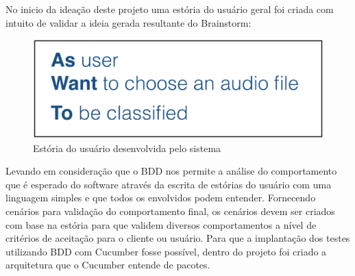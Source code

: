 No inicio da ideação deste projeto uma estória do usuário geral foi criada com intuito de validar a ideia gerada resultante do Brainstorm: 


\begin{figure}[H]
	\centering
	\captionsetup{justification=centering,margin=2cm}
	\includegraphics[scale=0.65]{capitulos/validacao/figuras/estoriaDoUsuarioDaAplicacao.eps}
	\caption{Estória do usuário desenvolvida pelo sistema}
	\label{fig:result-engajamento}
\end{figure}

Levando em consideração que o BDD nos permite a análise do comportamento que é esperado do software através da escrita de estórias do usuário com uma linguagem simples e que todos os envolvidos podem entender. Fornecendo cenários para validação do comportamento final, os cenários devem ser criados com base na estória para que validem diversos comportamentos a nível de critérios de aceitação para o cliente ou usuário. Para que a implantação dos testes utilizando BDD com Cucumber fosse possível, dentro do projeto foi criado a arquitetura que o Cucumber entende de pacotes.

